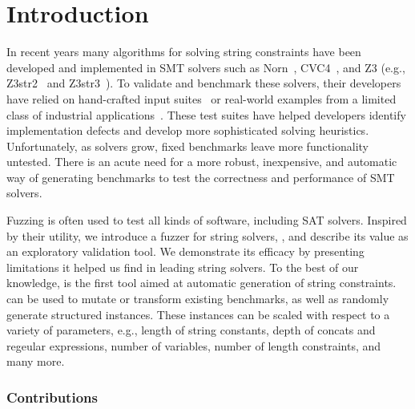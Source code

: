 \section{Introduction}

In recent years many algorithms for solving string constraints have
been developed and implemented in SMT solvers such as Norn~\cite{norn},
CVC4~\cite{cvc4}, and Z3 (e.g., Z3str2~\cite{z3str2} and Z3str3~\cite{z3str3}).
To validate and benchmark these solvers, their developers have relied on
hand-crafted input suites~\cite{cvc4-tests,z3str3-tests,z3str2-tests} or
real-world examples from a limited class of industrial
applications~\cite{kaluza,kausler}. These test suites have helped
developers identify implementation defects and develop more
sophisticated solving heuristics. Unfortunately, as solvers grow,
fixed benchmarks leave more functionality untested.
There is an acute need for a more robust, inexpensive, and automatic way
of generating benchmarks to test
the correctness and performance of SMT solvers.

Fuzzing is often used to test all kinds of software,
including SAT solvers. Inspired by their utility, we introduce a
fuzzer for string solvers, \fuzzer{}, and describe its value as an
exploratory validation tool. We demonstrate its efficacy
by presenting limitations it helped us find in
leading string solvers. To the best of our knowledge, \fuzzer{} is the
first tool aimed at automatic generation of string constraints. \fuzzer{} can
be used to mutate or transform existing benchmarks, as well as
randomly generate structured instances. These instances can be scaled with
respect to a variety of parameters, e.g., length of string constants,
depth of concats and regeular expressions, number of variables,
number of length constraints, and many more.

\subsubsection{Contributions}


